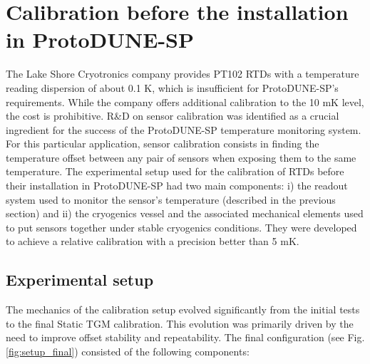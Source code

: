\section{Calibration before the installation in ProtoDUNE-SP}
\label{sec:old_calib}

\noindent The Lake Shore Cryotronics company provides PT102 RTDs with a temperature reading dispersion of about 0.1 K, which is insufficient for ProtoDUNE-SP's requirements. While the company offers additional calibration to the 10 mK level, the cost is prohibitive. R\&D on sensor calibration was identified as a crucial ingredient for the success of the ProtoDUNE-SP temperature monitoring system. For this particular application, sensor calibration consists in finding the temperature offset between any pair of sensors when exposing them to the same temperature. The experimental setup used for the calibration of RTDs before their installation in ProtoDUNE-SP had two main components: i) the readout system used to monitor the sensor's temperature (described in the previous section) and ii) the cryogenics vessel and the associated mechanical elements used to put sensors together under stable cryogenics conditions. They were developed to achieve a relative calibration with a precision better than 5 mK. %

\subsection{Experimental setup}
\noindent The mechanics of the calibration setup evolved significantly from the initial tests to the final Static TGM  calibration. This evolution was primarily driven by the need to improve offset stability and repeatability. The final configuration (see Fig. \ref{fig:setup_final}) consisted of the following components:

